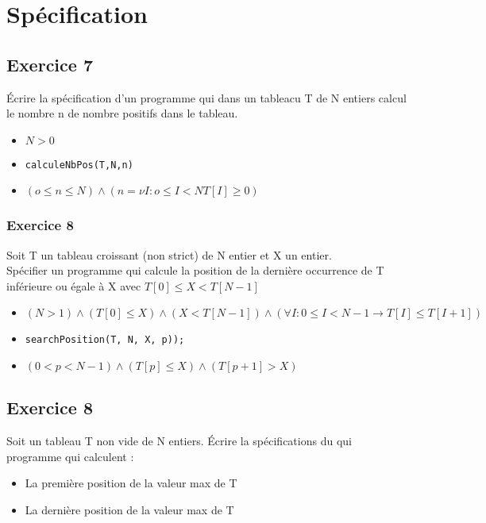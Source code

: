 \section{Spécification}
\subsection{Exercice 7}
	\'Ecrire la spécification d'un programme qui dans un tableacu T de N entiers calcul le nombre n de nombre positifs dans le tableau.

	\begin{itemize}
		\item $N > 0$
		\item \texttt{calculeNbPos(T,N,n)}
		\item $(o \leq n \leq N) \wedge (n = \nu I : o \leq I < N T[I] \geq 0) $
	\end{itemize}
\subsubsection{Exercice 8}
	Soit T un tableau croissant (non strict) de N entier et X un entier.\\
	Spécifier un programme qui calcule la position de la dernière occurrence de T inférieure ou égale à X avec $T[0] \leq X < T[N-1]$

	\begin{itemize}
		\item $(N > 1) \wedge (T[0] \leq X) \wedge (X < T[N-1]) \wedge (\forall I : 0 \leq I < N - 1 \rightarrow T[I] \leq T[I+1])$
		\item \texttt{searchPosition(T, N, X, p));} 
		\item $(0 < p < N - 1) \wedge (T[p] \leq X) \wedge (T[p+1] > X)$
	\end{itemize}

\subsection{Exercice 8}
	Soit un tableau T non vide de N entiers.  \'Ecrire la spécifications du qui programme qui calculent :
	\begin{itemize}
		\item La première position de la valeur max de T
		\item La dernière position de la valeur max de T
	\end{itemize}
